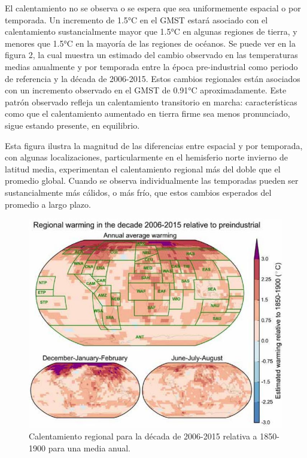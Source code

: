 \documentclass{article}
\begin{document}
El calentamiento no se observa o se espera que sea uniformemente espacial o por temporada. Un incremento de 1.5°C en el GMST estará asociado con el calentamiento sustancialmente mayor que 1.5°C en algunas regiones de tierra, y menores que 1.5°C en la mayoría de las regiones de océanos. Se puede ver en la figura 2, la cual muestra un estimado del cambio observado en las temperaturas medias anualmente y por temporada entre la época pre-industrial como periodo de referencia y la década de 2006-2015. Estos cambios regionales están asociados con un incremento observado en el GMST de 0.91°C aproximadamente. Este patrón observado refleja un calentamiento transitorio en marcha: características como que el calentamiento aumentado en tierra firme sea menos pronunciado, sigue estando presente, en equilibrio. 

Esta figura ilustra la magnitud de las diferencias entre espacial y por temporada, con algunas localizaciones, particularmente en el hemisferio norte invierno de latitud media, experimentan el calentamiento regional más del doble que el promedio global. Cuando se observa individualmente las temporadas pueden ser sustancialmente más cálidos, o más frío, que estos cambios esperados del promedio a largo plazo.


\begin{figure}[h]
    \centering
    \includegraphics[scale=0.4]{Figura2}
    \caption{Calentamiento regional para la década de 2006-2015 relativa a 1850-1900 para una media anual.}
    \label{Figura 2}
\end{figure}
\end{document}
